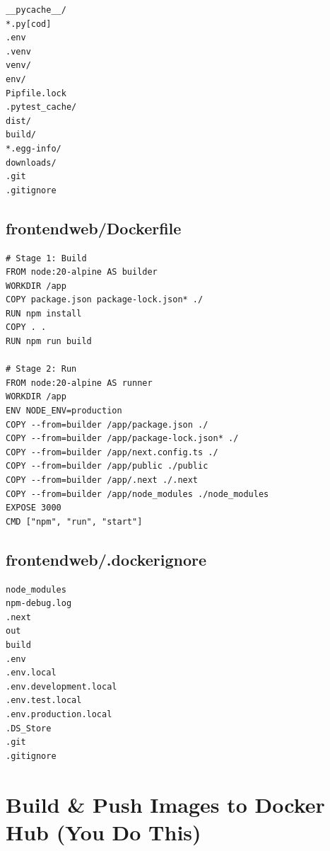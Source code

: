 \documentclass[12pt]{article}
\newenvironment{codeblock}{%
  \needspace{6\baselineskip}%
  \noindent\minipage{\linewidth}%
}{%
  \endminipage%
}
\begin{document}
\begin{codeblock}
\begin{lstlisting}[style=codestyle]
__pycache__/
*.py[cod]
.env
.venv
venv/
env/
Pipfile.lock
.pytest_cache/
dist/
build/
*.egg-info/
downloads/
.git
.gitignore
\end{lstlisting}
\end{codeblock}

\subsection{frontendweb/Dockerfile}

\begin{codeblock}
\begin{lstlisting}[style=codestyle]
# Stage 1: Build
FROM node:20-alpine AS builder
WORKDIR /app
COPY package.json package-lock.json* ./
RUN npm install
COPY . .
RUN npm run build

# Stage 2: Run
FROM node:20-alpine AS runner
WORKDIR /app
ENV NODE_ENV=production
COPY --from=builder /app/package.json ./
COPY --from=builder /app/package-lock.json* ./
COPY --from=builder /app/next.config.ts ./
COPY --from=builder /app/public ./public
COPY --from=builder /app/.next ./.next
COPY --from=builder /app/node_modules ./node_modules
EXPOSE 3000
CMD ["npm", "run", "start"]
\end{lstlisting}
\end{codeblock}

\subsection{frontendweb/.dockerignore}

\begin{codeblock}
\begin{lstlisting}[style=codestyle]
node_modules
npm-debug.log
.next
out
build
.env
.env.local
.env.development.local
.env.test.local
.env.production.local
.DS_Store
.git
.gitignore
\end{lstlisting}
\end{codeblock}

\section{Build \& Push Images to Docker Hub (You Do This)}
\end{document}

